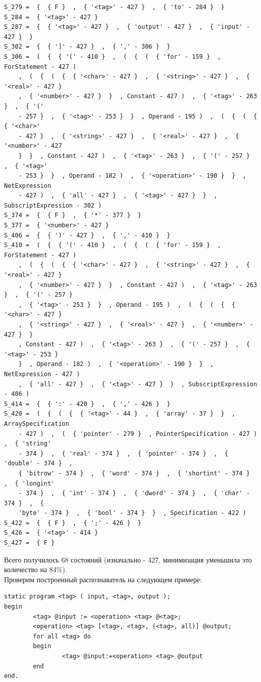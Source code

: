 \documentclass[12pt]{article}
\begin{document}
\begin{verbatim}
S_279 =  {  { F }  ,  { '<tag>' - 427 }  ,  { 'to' - 284 }  } 
S_284 =  { '<tag>' - 427 } 
S_287 =  {  { '<tag>' - 427 }  ,  { 'output' - 427 }  ,  { 'input' - 427 }  } 
S_302 =  {  { ']' - 427 }  ,  { ',' - 306 }  } 
S_306 =  (  {  { '(' - 410 }  ,  (  {  (  { 'for' - 159 }  , ForStatement - 427 )  
    ,  (  {  (  {  { '<char>' - 427 }  ,  { '<string>' - 427 }  ,  { '<real>' - 427 }  
    ,  { '<number>' - 427 }  }  , Constant - 427 )  ,  { '<tag>' - 263 }  ,  { '(' 
    - 257 }  ,  { '<tag>' - 253 }  }  , Operand - 195 )  ,  (  {  (  {  { '<char>' 
    - 427 }  ,  { '<string>' - 427 }  ,  { '<real>' - 427 }  ,  { '<number>' - 427 
    }  }  , Constant - 427 )  ,  { '<tag>' - 263 }  ,  { '(' - 257 }  ,  { '<tag>' 
    - 253 }  }  , Operand - 182 )  ,  { '<operation>' - 190 }  }  , NetExpression 
    - 427 )  ,  { 'all' - 427 }  ,  { '<tag>' - 427 }  }  , SubscriptExpression - 302 ) 
S_374 =  {  { F }  ,  { '*' - 377 }  } 
S_377 =  { '<number>' - 427 } 
S_406 =  {  { ')' - 427 }  ,  { ',' - 410 }  } 
S_410 =  (  {  { '(' - 410 }  ,  (  {  (  { 'for' - 159 }  , ForStatement - 427 )  
    ,  (  {  (  {  { '<char>' - 427 }  ,  { '<string>' - 427 }  ,  { '<real>' - 427 }  
    ,  { '<number>' - 427 }  }  , Constant - 427 )  ,  { '<tag>' - 263 }  ,  { '(' - 257 }  
    ,  { '<tag>' - 253 }  }  , Operand - 195 )  ,  (  {  (  {  { '<char>' - 427 }  
    ,  { '<string>' - 427 }  ,  { '<real>' - 427 }  ,  { '<number>' - 427 }  }  
    , Constant - 427 )  ,  { '<tag>' - 263 }  ,  { '(' - 257 }  ,  { '<tag>' - 253 }  
    }  , Operand - 182 )  ,  { '<operation>' - 190 }  }  , NetExpression - 427 )  
    ,  { 'all' - 427 }  ,  { '<tag>' - 427 }  }  , SubscriptExpression - 406 ) 
S_414 =  {  { ':' - 420 }  ,  { ',' - 426 }  } 
S_420 =  (  {  (  {  { '<tag>' - 44 }  ,  { 'array' - 37 }  }  , ArraySpecification 
    - 427 )  ,  (  { 'pointer' - 279 }  , PointerSpecification - 427 )  ,  { 'string' 
    - 374 }  ,  { 'real' - 374 }  ,  { 'pointer' - 374 }  ,  { 'double' - 374 }  ,  
    { 'bitrow' - 374 }  ,  { 'word' - 374 }  ,  { 'shortint' - 374 }  ,  { 'longint' 
    - 374 }  ,  { 'int' - 374 }  ,  { 'dword' - 374 }  ,  { 'char' - 374 }  ,  { 
    'byte' - 374 }  ,  { 'bool' - 374 }  }  , Specification - 422 ) 
S_422 =  {  { F }  ,  { ';' - 426 }  } 
S_426 =  { '<tag>' - 414 } 
S_427 =  { F }  
\end{verbatim}

Всего получилось 68 состояний (изначально - 427, минимизация уменьшила это количество на 84\%).\\

Проверим построенный распознаватель на следующем примере:
\begin{verbatim}
static program <tag> ( input, <tag>, output );
begin
        <tag> @input := <operation> <tag> @<tag>;
        <operation> <tag> [<tag>, <tag>, (<tag>, all)] @output;
        for all <tag> do
        begin
                <tag> @input:=<operation> <tag> @output
        end
end.
\end{verbatim}
\end{document}
